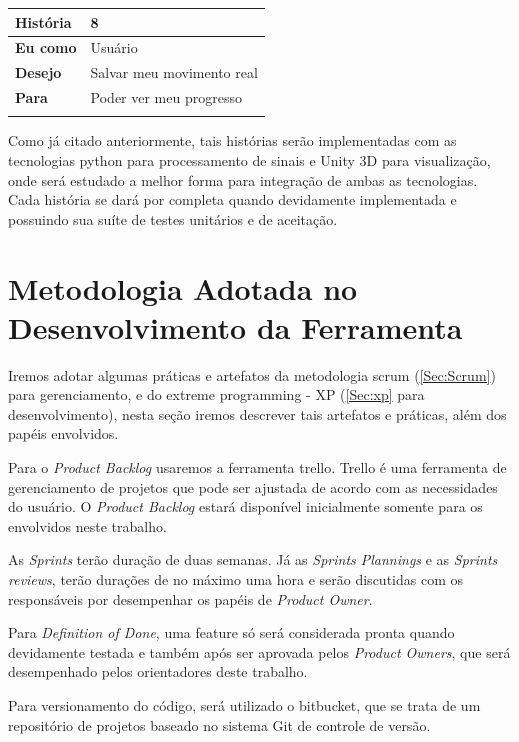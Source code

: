 \begin{table}[]
\begin{tabular}{|l|l|}
\textbf{História} & 8                                                        \\ \hline
\textbf{Eu como}  & Usuário                                                  \\ \hline
\textbf{Desejo}   & Salvar meu movimento real                                \\ \hline
\textbf{Para}     & Poder ver meu progresso                                  \\ \hline
\multicolumn{2}{|l|}{}                                                       \\ \hline
\end{tabular}
\end{table}

  Como já citado anteriormente, tais histórias serão implementadas com as tecnologias
python para processamento de sinais e Unity 3D para visualização, onde será 
estudado a melhor forma para integração de ambas as tecnologias. Cada história
se dará por completa quando devidamente implementada e possuindo sua suíte de testes
unitários e de aceitação.

\section{Metodologia Adotada no Desenvolvimento da Ferramenta}
  Iremos adotar algumas práticas e artefatos da  metodologia 
scrum (\ref{Sec:Scrum}) para gerenciamento, e do extreme programming - XP (\ref{Sec:xp}
para desenvolvimento), nesta seção iremos descrever tais artefatos e práticas, 
além dos papéis envolvidos.

  Para o \textit{Product Backlog}  usaremos a ferramenta trello. Trello é uma ferramenta
de gerenciamento de projetos que pode ser ajustada de acordo com as necessidades
do usuário. O \textit{Product Backlog} estará disponível inicialmente somente para
os envolvidos neste trabalho.

  As \textit{Sprints} terão duração de duas semanas. Já as \textit{Sprints Plannings}
e as \textit{Sprints reviews}, terão durações de no máximo uma hora e serão 
discutidas com os responsáveis por desempenhar os papéis de \textit{Product Owner}.

  Para \textit{Definition of Done}, uma feature só será considerada pronta quando
devidamente testada e também após ser aprovada pelos \textit{Product Owners}, que 
será desempenhado pelos orientadores deste trabalho.
  
  Para versionamento do código, será utilizado o bitbucket, que se trata de um
repositório de projetos baseado no sistema Git de controle de versão.

